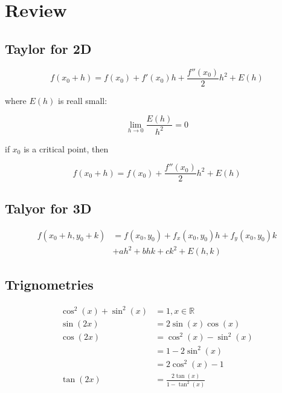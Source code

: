 \section{Review}

  \subsection{Taylor for 2D}

    \begin{equation}
      f\left( x_{0} + h \right)
        = f\left( x_{0} \right)
        + f'\left( x_{0} \right) h
        + \frac{f''\left( x_{0} \right)}{2} h^{2}
        + E\left( h \right)
    \end{equation}

    where $ E\left( h \right) $ is reall small:

    \begin{equation}
      \lim_{h \to 0} \frac{E\left( h \right)}{h^{2}} = 0
    \end{equation}

    if $ x_{0} $ is a critical point, then

    \begin{equation}
      f\left( x_{0} + h \right)
        = f\left( x_{0} \right)
        + \frac{f''\left( x_{0} \right)}{2} h^{2}
        + E\left( h \right)
    \end{equation}

  \subsection{Talyor for 3D}

    \begin{align*}
      f\left( x_{0} + h, y_{0} + k \right)
        &= f\left( x_{0}, y_{0} \right)
        + f_{x}\left( x_{0}, y_{0} \right) h
        + f_{y}\left( x_{0}, y_{0} \right) k \\
        &+ ah^{2} + bhk + ck^{2}
        + E\left( h, k \right)
    \end{align*}

  \subsection{Trignometries}

    \begin{align}
      \cos^{2}\left( x \right) + \sin^{2}\left( x \right) &= 1, x \in \mathbb{R} \\
      \sin\left( 2x \right) &= 2 \sin\left( x \right) \cos\left( x \right) \\
      \cos\left( 2x \right)
        &= \cos^{2}\left( x \right) - \sin^{2}\left( x \right) \\
        &= 1 - 2\sin^{2}\left( x \right) \\
        &= 2\cos^{2}\left( x \right) - 1 \\
      \tan\left( 2x \right)
        &= \frac{2\tan\left( x \right)}{1 - \tan^{2}\left( x \right)}
    \end{align}

